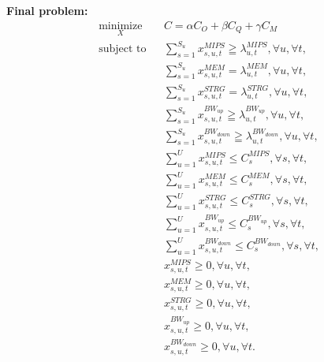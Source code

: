 \documentclass{article}
\begin{document}
\pagebreak
\noindent\textbf{Final problem:}\\[6pt]
\begin{equation*}
\begin{aligned}
& \underset{X}{\text{minimize}}
& & C = \alpha C_O + \beta C_Q + \gamma C_M \\
& \text{subject to}
& & \sum_{s=1}^{S_u} x^{MIPS}_{s,u,t} \geqq \lambda^{MIPS}_{u,t}, \forall u, \forall t, \\
&&& \sum_{s=1}^{S_u} x^{MEM}_{s,u,t} = \lambda^{MEM}_{u,t}, \forall u, \forall t, \\
&&& \sum_{s=1}^{S_u} x^{STRG}_{s,u,t} = \lambda^{STRG}_{u,t}, \forall u, \forall t, \\
&&& \sum_{s=1}^{S_u}x^{BW_{up}}_{s,u,t} \geqq \lambda^{BW_{up}}_{u,t}, \forall u, \forall t, \\
&&& \sum_{s=1}^{S_u}x^{BW_{down}}_{s,u,t} \geqq \lambda^{BW_{down}}_{u,t}, \forall u, \forall t, \\
&&& \sum_{u=1}^U x^{MIPS}_{s,u,t} \leq C^{MIPS}_{s}, \forall s, \forall t, \\
&&& \sum_{u=1}^U x^{MEM}_{s,u,t} \leq C^{MEM}_{s}, \forall s, \forall t, \\
&&& \sum_{u=1}^U x^{STRG}_{s,u,t} \leq C^{STRG}_{s}, \forall s, \forall t, \\
&&& \sum_{u=1}^U x^{BW_{up}}_{s,u,t} \leq C^{BW_{up}}_{s}, \forall s, \forall t, \\
&&& \sum_{u=1}^U x^{BW_{down}}_{s,u,t} \leq C^{BW_{down}}_{s}, \forall s, \forall t, \\[6pt]
&&& x^{MIPS}_{s,u,t} \geq 0, \forall u, \forall t, \\[6pt]
&&& x^{MEM}_{s,u,t} \geq 0, \forall u, \forall t, \\[6pt]
&&& x^{STRG}_{s,u,t} \geq 0, \forall u, \forall t, \\[6pt]
&&& x^{BW_{up}}_{s,u,t} \geq 0, \forall u, \forall t, \\[6pt]
&&& x^{BW_{down}}_{s,u,t} \geq 0, \forall u, \forall t.
\end{aligned}
\end{equation*}












\pagebreak
\end{document}
